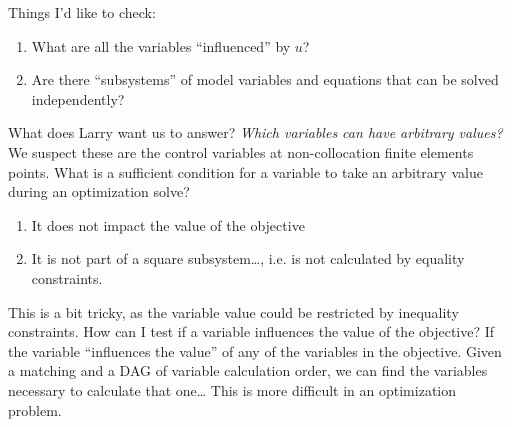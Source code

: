 \documentclass{article}
\begin{document}
Things I'd like to check:
\begin{enumerate}
  \item What are all the variables ``influenced'' by $u$?
  \item Are there ``subsystems'' of model variables and equations that can
    be solved independently?
\end{enumerate}
What does Larry want us to answer?
\emph{Which variables can have arbitrary values?}
We suspect these are the control variables at non-collocation finite elements
points.
What is a sufficient condition for a variable to take an arbitrary value
during an optimization solve?
\begin{enumerate}
  \item It does not impact the value of the objective
  \item It is not part of a square subsystem\ldots, i.e. is not calculated
    by equality constraints.
\end{enumerate}
This is a bit tricky, as the variable value could be restricted by inequality
constraints.
How can I test if a variable influences the value of the objective?
If the variable ``influences the value'' of any of the variables in the
objective.
Given a matching and a DAG of variable calculation order, we can find the
variables necessary to calculate that one\ldots
This is more difficult in an optimization problem.
\end{document}
